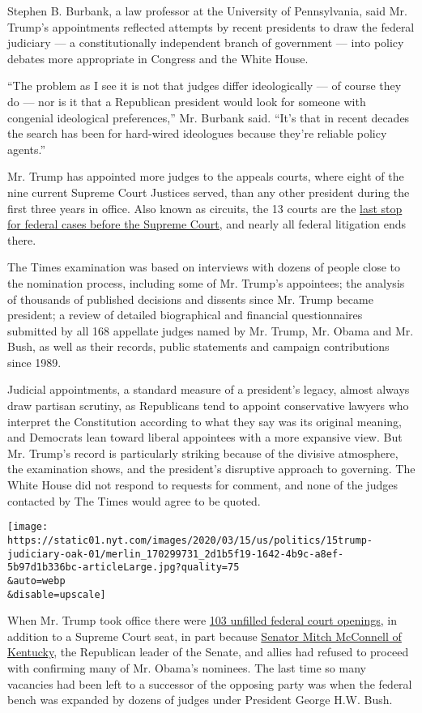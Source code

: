 Stephen B. Burbank, a law professor at the University of Pennsylvania,
said Mr. Trump's appointments reflected attempts by recent presidents to
draw the federal judiciary --- a constitutionally independent branch of
government --- into policy debates more appropriate in Congress and the
White House.

``The problem as I see it is not that judges differ ideologically --- of
course they do --- nor is it that a Republican president would look for
someone with congenial ideological preferences,'' Mr. Burbank said.
``It's that in recent decades the search has been for hard-wired
ideologues because they're reliable policy agents.''

Mr. Trump has appointed more judges to the appeals courts, where eight
of the nine current Supreme Court Justices served, than any other
president during the first three years in office. Also known as
circuits, the 13 courts are the
\href{https://www.uscourts.gov/statistics-reports/appellate-courts-and-cases-journalists-guide}{last
stop for federal cases before the Supreme Court,} and nearly all federal
litigation ends there.

The Times examination was based on interviews with dozens of people
close to the nomination process, including some of Mr. Trump's
appointees; the analysis of thousands of published decisions and
dissents since Mr. Trump became president; a review of detailed
biographical and financial questionnaires submitted by all 168 appellate
judges named by Mr. Trump, Mr. Obama and Mr. Bush, as well as their
records, public statements and campaign contributions since 1989.

Judicial appointments, a standard measure of a president's legacy,
almost always draw partisan scrutiny, as Republicans tend to appoint
conservative lawyers who interpret the Constitution according to what
they say was its original meaning, and Democrats lean toward liberal
appointees with a more expansive view. But Mr. Trump's record is
particularly striking because of the divisive atmosphere, the
examination shows, and the president's disruptive approach to governing.
The White House did not respond to requests for comment, and none of the
judges contacted by The Times would agree to be quoted.

\texttt{[image: https://static01.nyt.com/images/2020/03/15/us/politics/15trump-judiciary-oak-01/merlin\_170299731\_2d1b5f19-1642-4b9c-a8ef-5b97d1b336bc-articleLarge.jpg?quality=75\\\&auto=webp\\\&disable=upscale]}

When Mr. Trump took office there were
\href{https://www.brookings.edu/blog/fixgov/2020/01/28/judicial-appointments-in-trumps-first-three-years-myths-and-realities/}{103
unfilled federal court openings}, in addition to a Supreme Court seat,
in part because
\href{https://www.brookings.edu/blog/fixgov/2018/06/04/senate-obstructionism-handed-judicial-vacancies-to-trump/}{Senator
Mitch McConnell of Kentucky}, the Republican leader of the Senate, and
allies had refused to proceed with confirming many of Mr. Obama's
nominees. The last time so many vacancies had been left to a successor
of the opposing party was when the federal bench was expanded by dozens
of judges under President George H.W. Bush.

